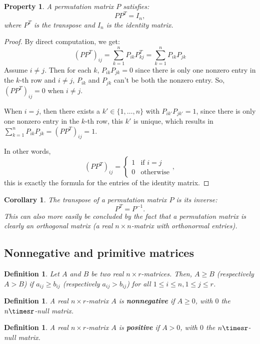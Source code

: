 \documentclass[a4paper,11pt]{report}
\newtheorem{property}[theorem]{Property}
\newtheorem{definition}[theorem]{Definition}
\newtheorem{corollary}[theorem]{Corollary}
\begin{document}
\begin{property}\label{permutatie}
A permutation matrix $P$ satisfies:
  $$PP^T = I_n,$$
  where $P^T$ is the transpose and $I_n$ is the identity matrix.
\end{property}
\begin{proof}
By direct computation, we get:
$$(PP^T)_{ij} = \sum^n_{k=1}P_{ik}P^T_{kj} = \sum^n_{k=1}P_{ik}P_{jk}$$
Assume $i \not = j$. Then for each $k$, $P_{ik}P_{jk} = 0$ since there is only
one nonzero entry in the $k$-th row and $i \not = j$, $P_{ik}$ and $P_{jk}$ 
can't be both the nonzero entry. So, $(PP^T)_{ij} = 0$ when $i \not = j$.

When $i=j$, then there exists a $k' \in \{1,\ldots,n\}$ with $P_{ik'}P_{jk'} = 1$, 
since there is only one nonzero entry in the $k$-th row, this $k'$ is unique, 
which results in $\sum^n_{k=1}P_{ik}P_{jk} = (PP^T)_{ij} = 1$.

In other words,
$$(PP^T)_{ij} = \begin{cases} 1 &\mbox{if } i = j \\ 
0 & \mbox{otherwise} \end{cases},$$
this is exactly the formula for the entries of the identity matrix.
\end{proof}

\begin{corollary}
  The transpose of a permutation matrix $P$ is its inverse:
  $$P^T = P^{-1}.$$
  This can also more easily be concluded by the fact that a permutation matrix 
  is clearly an orthogonal matrix (a real $n \times n$-matrix with orthonormal 
  entries).
\end{corollary}
\subsection{Nonnegative and primitive matrices}
\begin{definition}
  Let $A$ and $B$ be two real $n\times r$-matrices. Then, $A \geq B$ (respectively $A > B$) if $a_{ij} \geq b_{ij}$ 
  (respectively $a_{ij}>b_{ij}$) for all $1 \leq i \leq n, 1 \leq j\leq r$. 
\end{definition}
\begin{definition}  A real $n\times r$-matrix $A$ is \textbf{nonnegative} if $A \geq 0$, with $0$ the $n\timesr$-null matrix.
\end{definition}
\begin{definition}  A real $n\times r$-matrix $A$ is \textbf{positive} if $A > 0$, with $0$ the $n\timesr$-null matrix.
\end{definition}
\end{document}
